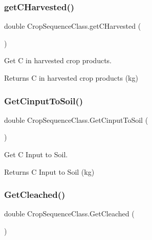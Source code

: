 \subsubsection{\texorpdfstring{getCHarvested()}{getCHarvested()}}
{\footnotesize\ttfamily double Crop\+Sequence\+Class.\+get\+C\+Harvested (\begin{DoxyParamCaption}{ }\end{DoxyParamCaption})\hspace{0.3cm}{\ttfamily [inline]}}



Get C in harvested crop products. 

\begin{DoxyReturn}{Returns}
C in harvested crop products (kg) 
\end{DoxyReturn}
\mbox{\label{class_crop_sequence_class_a7af568e3825da6fc14939143d5c92f3d}} 
\subsubsection{\texorpdfstring{GetCinputToSoil()}{GetCinputToSoil()}}
{\footnotesize\ttfamily double Crop\+Sequence\+Class.\+Get\+Cinput\+To\+Soil (\begin{DoxyParamCaption}{ }\end{DoxyParamCaption})\hspace{0.3cm}{\ttfamily [inline]}}



Get C Input to Soil. 

\begin{DoxyReturn}{Returns}
C Input to Soil (kg) 
\end{DoxyReturn}
\mbox{\label{class_crop_sequence_class_a175d714ee202041183d28dc2f5053bfa}} 
\subsubsection{\texorpdfstring{GetCleached()}{GetCleached()}}
{\footnotesize\ttfamily double Crop\+Sequence\+Class.\+Get\+Cleached (\begin{DoxyParamCaption}{ }\end{DoxyParamCaption})\hspace{0.3cm}{\ttfamily [inline]}}



